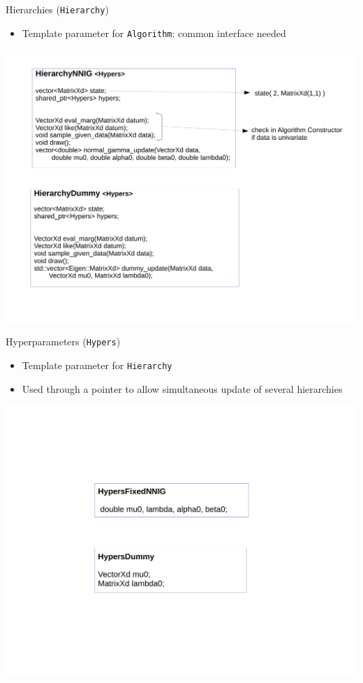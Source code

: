 \begin{frame}{Hierarchies (\texttt{Hierarchy})}
\begin{itemize}
	\item Template parameter for \texttt{Algorithm}: common interface needed
\end{itemize}

\begin{center}
	\includegraphics[scale=0.35]{etc/hierarchy.pdf}
\end{center}

\end{frame}


\begin{frame}{Hyperparameters (\texttt{Hypers})}
\begin{itemize}
	\item Template parameter for \texttt{Hierarchy}
	\item Used through a pointer to allow simultaneous update of several hierarchies
\end{itemize}

\begin{center}
	\includegraphics[scale=0.35]{etc/hypers.pdf}
\end{center}
\end{frame}


